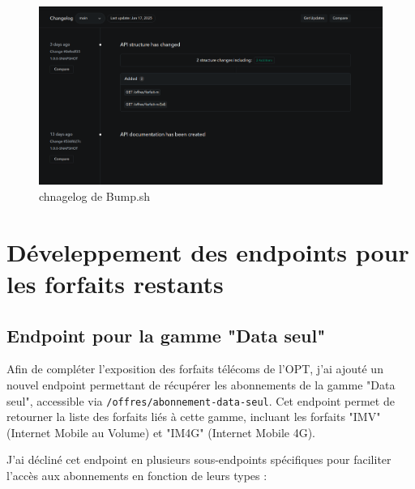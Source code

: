 \documentclass{article}
\begin{document}
	\begin{figure}[H] \centering \includegraphics[width=\textwidth]{asset/changelog.png} \caption{chnagelog de Bump.sh} \label{fig:sonarq}\end{figure}
	\section{Déveleppement des endpoints pour les forfaits restants}
	\subsection{Endpoint pour la gamme "Data seul"}
	
	Afin de compléter l'exposition des forfaits télécoms de l'OPT, j'ai ajouté un nouvel endpoint permettant de récupérer les abonnements de la gamme "Data seul", accessible via \texttt{/offres/abonnement-data-seul}. Cet endpoint permet de retourner la liste des forfaits liés à cette gamme, incluant les forfaits "IMV" (Internet Mobile au Volume) et "IM4G" (Internet Mobile 4G).
	
	J'ai décliné cet endpoint en plusieurs sous-endpoints spécifiques pour faciliter l'accès aux abonnements en fonction de leurs types :
\end{document}
